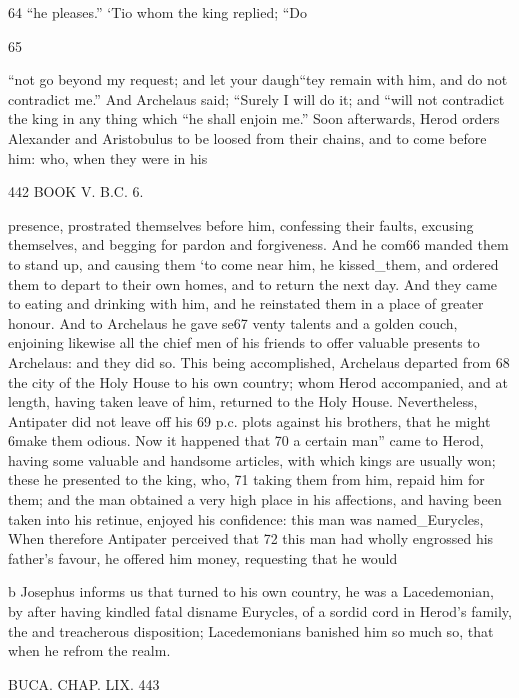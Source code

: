 64 “he pleases.” ‘Tio whom the king replied; “Do 

65 

“not go beyond my request; and let your daugh“tey remain with him, and do not contradict me.” And Archelaus said; “Surely I will do it; and “will not contradict the king in any thing which “he shall enjoin me.” 
Soon afterwards, Herod orders Alexander and Aristobulus to be loosed from their chains, and to come before him: who, when they were in his 

442 BOOK V. B.C. 6. 

presence, prostrated themselves before him, confessing their faults, excusing themselves, and begging for pardon and forgiveness. And he com66 manded them to stand up, and causing them ‘to come near him, he kissed_them, and ordered them to depart to their own homes, and to return the next day. And they came to eating and drinking with him, and he reinstated them in a place of greater honour. And to Archelaus he gave se67 venty talents and a golden couch, enjoining likewise all the chief men of his friends to offer valuable presents to Archelaus: and they did so. This being accomplished, Archelaus departed from 68 the city of the Holy House to his own country; whom Herod accompanied, and at length, having taken leave of him, returned to the Holy House. Nevertheless, Antipater did not leave off his 69 p.c. plots against his brothers, that he might 6make them odious. Now it happened that 70 a certain man” came to Herod, having some valuable and handsome articles, with which kings are usually won; these he presented to the king, who, 71 taking them from him, repaid him for them; and the man obtained a very high place in his affections, and having been taken into his retinue, enjoyed his confidence: this man was named_Eurycles, When therefore Antipater perceived that 72 this man had wholly engrossed his father’s favour, he offered him money, requesting that he would 

b Josephus informs us that turned to his own country, he was a Lacedemonian, by after having kindled fatal disname Eurycles, of a sordid cord in Herod’s family, the and treacherous disposition; Lacedemonians banished him so much so, that when he refrom the realm. 

BUCA. CHAP. LIX. 443 

